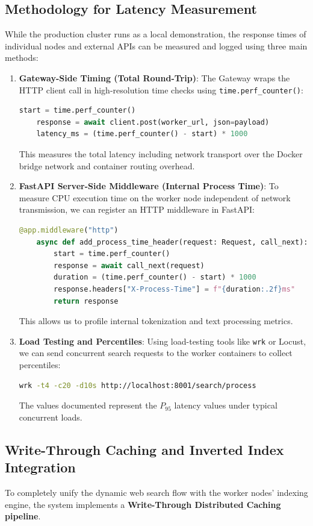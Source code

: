 \documentclass[11pt,a4paper]{article}
\begin{document}
\subsection{Methodology for Latency Measurement}
While the production cluster runs as a local demonstration, the response times of individual nodes and external APIs can be measured and logged using three main methods:
\begin{enumerate}
    \item \textbf{Gateway-Side Timing (Total Round-Trip)}:
    The Gateway wraps the HTTP client call in high-resolution time checks using \texttt{time.perf\_counter()}:
    \begin{lstlisting}[language=Python]
    start = time.perf_counter()
    response = await client.post(worker_url, json=payload)
    latency_ms = (time.perf_counter() - start) * 1000
    \end{lstlisting}
    This measures the total latency including network transport over the Docker bridge network and container routing overhead.
    
    \item \textbf{FastAPI Server-Side Middleware (Internal Process Time)}:
    To measure CPU execution time on the worker node independent of network transmission, we can register an HTTP middleware in FastAPI:
    \begin{lstlisting}[language=Python]
    @app.middleware("http")
    async def add_process_time_header(request: Request, call_next):
        start = time.perf_counter()
        response = await call_next(request)
        duration = (time.perf_counter() - start) * 1000
        response.headers["X-Process-Time"] = f"{duration:.2f}ms"
        return response
    \end{lstlisting}
    This allows us to profile internal tokenization and text processing metrics.
    
    \item \textbf{Load Testing and Percentiles}:
    Using load-testing tools like \texttt{wrk} or Locust, we can send concurrent search requests to the worker containers to collect percentiles:
    \begin{lstlisting}[language=bash]
    wrk -t4 -c20 -d10s http://localhost:8001/search/process
    \end{lstlisting}
    The values documented represent the $P_{95}$ latency values under typical concurrent loads.
\end{enumerate}

\subsection{Write-Through Caching and Inverted Index Integration}
To completely unify the dynamic web search flow with the worker nodes' indexing engine, the system implements a \textbf{Write-Through Distributed Caching pipeline}.
\end{document}
